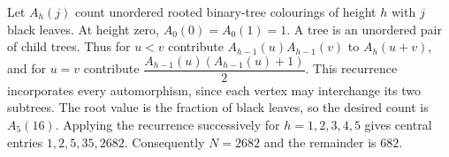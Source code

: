 Let $A_h(j)$ count unordered rooted binary-tree colourings of height $h$ with $j$ black leaves. At height zero, $A_0(0)=A_0(1)=1$. A tree is an unordered pair of child trees. Thus for $u<v$ contribute $A_{h-1}(u)A_{h-1}(v)$ to $A_h(u+v)$, and for $u=v$ contribute $\dfrac{A_{h-1} (u) (A_{h-1}(u)+1)}{2}$. This recurrence incorporates every automorphism, since each vertex may interchange its two subtrees. The root value is the fraction of black leaves, so the desired count is $A_5(16)$. Applying the recurrence successively for $h=1,2,3,4,5$ gives central entries $1,2,5,35,2682$. Consequently $N=2682$ and the remainder is $\boxed{682}$.
